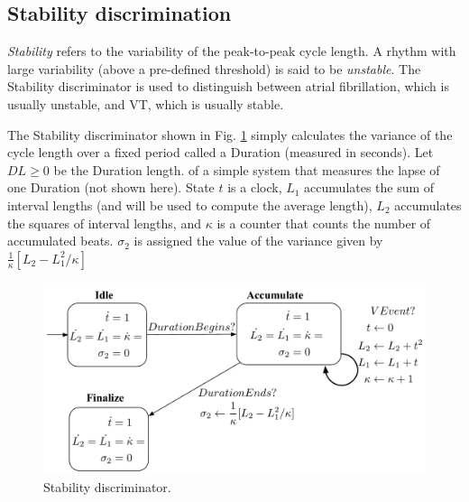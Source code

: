 \subsection{Stability discrimination}
\label{sec:stability}
\emph{Stability} refers to the variability of the peak-to-peak cycle length.
A rhythm with large variability (above a pre-defined threshold) is said to be \emph{unstable}.
The Stability discriminator is used to distinguish between atrial fibrillation, which is usually unstable, and \ac{VT}, which is usually stable.

The Stability discriminator shown in Fig. \ref{fig:Hstab} simply calculates the variance of the cycle length over a fixed period called a Duration (measured in seconds).
Let $DL \geq 0$ be the Duration length.
 of a simple system that measures the lapse of one Duration (not shown here).
State $t$ is a clock, $L_1$ accumulates the sum of interval lengths (and will be used to compute the average length), 
$L_2$ accumulates the squares of interval lengths,
and $\kappa$ is a counter that counts the number of accumulated beats.
$\sigma_2$ is assigned the value of the variance given by $\frac{1}{\kappa}[L_2 - L_1^2/\kappa]$
\begin{figure}[t]
	\centering
	\includegraphics[scale=0.3]{figures/stability1v2}
	\vspace{-10pt}
	\caption{Stability discriminator.}
	\vspace{-10pt}
	\label{fig:Hstab}
\end{figure}

